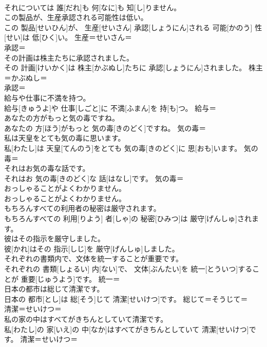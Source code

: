 \documentclass[8pt]{extreport}
\begin{document}
\begin{CJK}{UTF8}{min}
\\	それについては 誰[だれ]も 何[なに]も 知[し]りません。	
\\	この製品が、生産承認される可能性は低い。	
\\	この 製品[せいひん]が、 生産[せいさん] 承認[しょうにん]される 可能[かのう] 性[せい]は 低[ひく]い。	生産＝せいさん＝ 
\\	承認＝ 
\\	その計画は株主たちに承認されました。	
\\	その 計画[けいかく]は 株主[かぶぬし]たちに 承認[しょうにん]されました。	株主＝かぶぬし＝ 
\\	承認＝ 
\\	給与や仕事に不満を持つ。	
\\	給与[きゅうよ]や 仕事[しごと]に 不満[ふまん]を 持[も]つ。	給与＝ 
\\	あなたの方がもっと気の毒ですね。	
\\	あなたの 方[ほう]がもっと 気の毒[きのどく]ですね。	気の毒＝ 
\\	私は天皇をとても気の毒に思います。	
\\	私[わたし]は 天皇[てんのう]をとても 気の毒[きのどく]に 思[おも]います。	気の毒＝ 
\\	それはお気の毒な話です。	
\\	それはお 気の毒[きのどく]な 話[はなし]です。	気の毒＝ 
\\	おっしゃることがよくわかりません。	
\\	おっしゃることがよくわかりません。	
\\	もちろんすべての利用者の秘密は厳守されます。	
\\	もちろんすべての 利用[りよう] 者[しゃ]の 秘密[ひみつ]は 厳守[げんしゅ]されます。	
\\	彼はその指示を厳守しました。	
\\	彼[かれ]はその 指示[しじ]を 厳守[げんしゅ]しました。	
\\	それぞれの書類内で、文体を統一することが重要です。	
\\	それぞれの 書類[しょるい] 内[ない]で、 文体[ぶんたい]を 統一[とういつ]することが 重要[じゅうよう]です。	統一＝ 
\\	日本の都市は総じて清潔です。	
\\	日本の 都市[とし]は 総[そう]じて 清潔[せいけつ]です。	総じて＝そうじて＝ 
\\	清潔＝せいけつ＝ 
\\	私の家の中はすべてがきちんとしていて清潔です。	
\\	私[わたし]の 家[いえ]の 中[なか]はすべてがきちんとしていて 清潔[せいけつ]です。	清潔＝せいけつ＝ 

\end{CJK}
\end{document}
